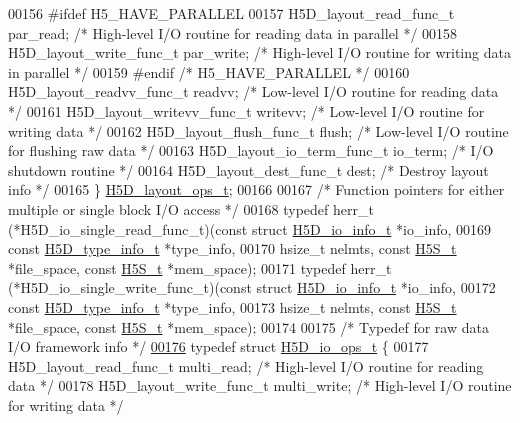 \begin{DoxyCode}
00156 \textcolor{preprocessor}{#ifdef H5\_HAVE\_PARALLEL}
00157     H5D\_layout\_read\_func\_t par\_read;    \textcolor{comment}{/* High-level I/O routine for reading data in parallel */}
00158     H5D\_layout\_write\_func\_t par\_write;  \textcolor{comment}{/* High-level I/O routine for writing data in parallel */}
00159 \textcolor{preprocessor}{#endif }\textcolor{comment}{/* H5\_HAVE\_PARALLEL */}\textcolor{preprocessor}{}
00160     H5D\_layout\_readvv\_func\_t readvv;    \textcolor{comment}{/* Low-level I/O routine for reading data */}
00161     H5D\_layout\_writevv\_func\_t writevv;  \textcolor{comment}{/* Low-level I/O routine for writing data */}
00162     H5D\_layout\_flush\_func\_t flush;      \textcolor{comment}{/* Low-level I/O routine for flushing raw data */}
00163     H5D\_layout\_io\_term\_func\_t io\_term;  \textcolor{comment}{/* I/O shutdown routine */}
00164     H5D\_layout\_dest\_func\_t dest;        \textcolor{comment}{/* Destroy layout info */}
00165 \} \hyperlink{struct_h5_d__layout__ops__t}{H5D\_layout\_ops\_t};
00166 
00167 \textcolor{comment}{/* Function pointers for either multiple or single block I/O access */}
00168 \textcolor{keyword}{typedef} herr\_t (*H5D\_io\_single\_read\_func\_t)(\textcolor{keyword}{const} \textcolor{keyword}{struct }\hyperlink{struct_h5_d__io__info__t}{H5D\_io\_info\_t} *io\_info,
00169     \textcolor{keyword}{const} \hyperlink{struct_h5_d__type__info__t}{H5D\_type\_info\_t} *type\_info,
00170     hsize\_t nelmts, \textcolor{keyword}{const} \hyperlink{struct_h5_s__t}{H5S\_t} *file\_space, \textcolor{keyword}{const} \hyperlink{struct_h5_s__t}{H5S\_t} *mem\_space);
00171 \textcolor{keyword}{typedef} herr\_t (*H5D\_io\_single\_write\_func\_t)(\textcolor{keyword}{const} \textcolor{keyword}{struct }\hyperlink{struct_h5_d__io__info__t}{H5D\_io\_info\_t} *io\_info,
00172     \textcolor{keyword}{const} \hyperlink{struct_h5_d__type__info__t}{H5D\_type\_info\_t} *type\_info,
00173     hsize\_t nelmts, \textcolor{keyword}{const} \hyperlink{struct_h5_s__t}{H5S\_t} *file\_space, \textcolor{keyword}{const} \hyperlink{struct_h5_s__t}{H5S\_t} *mem\_space);
00174 
00175 \textcolor{comment}{/* Typedef for raw data I/O framework info */}
\hyperlink{struct_h5_d__io__ops__t}{00176} \textcolor{keyword}{typedef} \textcolor{keyword}{struct }\hyperlink{struct_h5_d__io__ops__t}{H5D\_io\_ops\_t} \{
00177     H5D\_layout\_read\_func\_t multi\_read;          \textcolor{comment}{/* High-level I/O routine for reading data */}
00178     H5D\_layout\_write\_func\_t multi\_write;        \textcolor{comment}{/* High-level I/O routine for writing data */}

\end{DoxyCode}

